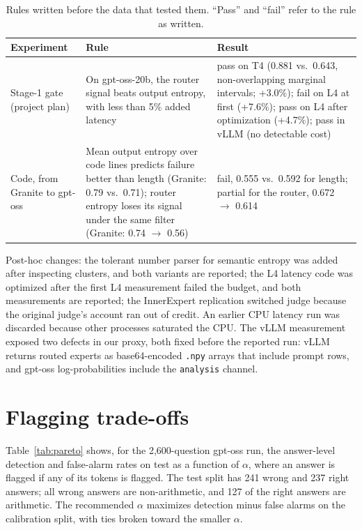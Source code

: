 \documentclass[11pt]{article}
\begin{document}
\begin{table}[h]
\centering
\scriptsize
\caption{Rules written before the data that tested them. ``Pass'' and ``fail'' refer to the rule as written.}
\label{tab:rules}
\begin{tabular}{p{2.6cm}p{5.6cm}p{5.6cm}}
\toprule
Experiment & Rule & Result \\
\midrule
Stage-1 gate (project plan) & On gpt-oss-20b, the router signal beats output entropy, with less than 5\% added latency & pass on T4 (0.881 vs.\ 0.643, non-overlapping marginal intervals; +3.0\%); fail on L4 at first (+7.6\%); pass on L4 after optimization (+4.7\%); pass in vLLM (no detectable cost) \\
Code, from Granite to gpt-oss & Mean output entropy over code lines predicts failure better than length (Granite: 0.79 vs.\ 0.71); router entropy loses its signal under the same filter (Granite: 0.74 $\rightarrow$ 0.56) & fail, 0.555 vs.\ 0.592 for length; partial for the router, 0.672 $\rightarrow$ 0.614 \\
\bottomrule
\end{tabular}
\end{table}

Post-hoc changes: the tolerant number parser for semantic entropy was added after inspecting clusters, and both variants are reported; the L4 latency code was optimized after the first L4 measurement failed the budget, and both measurements are reported; the InnerExpert replication switched judge because the original judge's account ran out of credit.
An earlier CPU latency run was discarded because other processes saturated the CPU.
The vLLM measurement exposed two defects in our proxy, both fixed before the reported run: vLLM returns routed experts as base64-encoded \texttt{.npy} arrays that include prompt rows, and gpt-oss log-probabilities include the \texttt{analysis} channel.

\section{Flagging trade-offs}
\label{app:pareto}

Table~\ref{tab:pareto} shows, for the 2,600-question gpt-oss run, the answer-level detection and false-alarm rates on test as a function of $\alpha$, where an answer is flagged if any of its tokens is flagged.
The test split has 241 wrong and 237 right answers; all wrong answers are non-arithmetic, and 127 of the right answers are arithmetic.
The recommended $\alpha$ maximizes detection minus false alarms on the calibration split, with ties broken toward the smaller $\alpha$.
\end{document}
